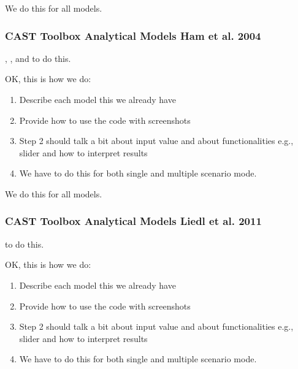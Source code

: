 \documentclass[letterpaper,10pt,english]{sphinxmanual}
\begin{document}
\sphinxAtStartPar
We do this for all models.


\subsubsection{CAST Toolbox \sphinxhyphen{} Analytical Models \sphinxhyphen{} Ham et al. 2004}
\label{\detokenize{contents/toolbox/an_model/ham2004:cast-toolbox-analytical-models-ham-et-al-2004}}\label{\detokenize{contents/toolbox/an_model/ham2004::doc}}
\sphinxAtStartPar
{}, ,  and  to do this.

\sphinxAtStartPar
OK, this is how we do:
\begin{enumerate}
%
\item {} 
\sphinxAtStartPar
Describe each model \sphinxhyphen{} this we already have

\item {} 
\sphinxAtStartPar
Provide how to use the code with screenshots

\item {} 
\sphinxAtStartPar
Step 2 should talk a bit about input value and about functionalities \sphinxhyphen{} e.g., slider and how to interpret results

\item {} 
\sphinxAtStartPar
We have to do this for both single and multiple scenario mode.

\end{enumerate}

\sphinxAtStartPar
We do this for all models.


\subsubsection{CAST Toolbox \sphinxhyphen{} Analytical Models \sphinxhyphen{} Liedl et al. 2011}
\label{\detokenize{contents/toolbox/an_model/liedl2011:cast-toolbox-analytical-models-liedl-et-al-2011}}\label{\detokenize{contents/toolbox/an_model/liedl2011::doc}}
\sphinxAtStartPar
{} to do this.

\sphinxAtStartPar
OK, this is how we do:
\begin{enumerate}
%
\item {} 
\sphinxAtStartPar
Describe each model \sphinxhyphen{} this we already have

\item {} 
\sphinxAtStartPar
Provide how to use the code with screenshots

\item {} 
\sphinxAtStartPar
Step 2 should talk a bit about input value and about functionalities \sphinxhyphen{} e.g., slider and how to interpret results

\item {} 
\sphinxAtStartPar
We have to do this for both single and multiple scenario mode.

\end{enumerate}
\end{document}
